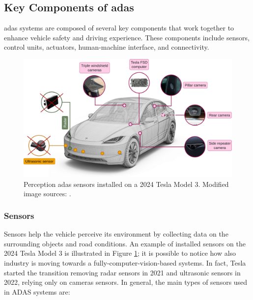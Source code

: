\subsection{Key Components of \acs{adas}}
\ac{adas} systems are composed of several key components that work together to 
enhance vehicle safety and driving experience. These components include sensors, 
control units, actuators, human-machine interface, and connectivity.
\begin{figure}
    \centering
    \includegraphics[width=\textwidth]{images/introduction/tesla_sensors.png}
    \caption[Components of an ADAS system]
    {Perception \acs{adas} sensors installed on a 2024 Tesla Model 3. Modified image sources: 
    \cites{mantangcg_2024_tesla_model_3}{valeo_2024_ultrasonic_sensor}
    {continental_2024_radar_sensor}{drivetesla_2024_pillar_camera}
    {drivetesla_2024_back_camera}{wikichip_2024_tesla_fsd_computer_board}
    {drivetesla_2024_front_camera}{drivetesla_2024_back_camera}.}
    \label{fig:adas_components}
\end{figure}

\subsubsection*{Sensors}
Sensors help the vehicle perceive its environment by collecting data on the 
surrounding objects and road conditions. An example of installed sensors on the 
2024 Tesla Model 3 is illustrated in Figure \ref{fig:adas_components}; it is 
possible to notice how also industry is moving towards a fully-computer-vision-based
systems. In fact, Tesla started the transition removing radar sensors in 2021 and 
ultrasonic sensors in 2022, relying only on cameras sensors.
In general, the main types of sensors used in ADAS systems are:

